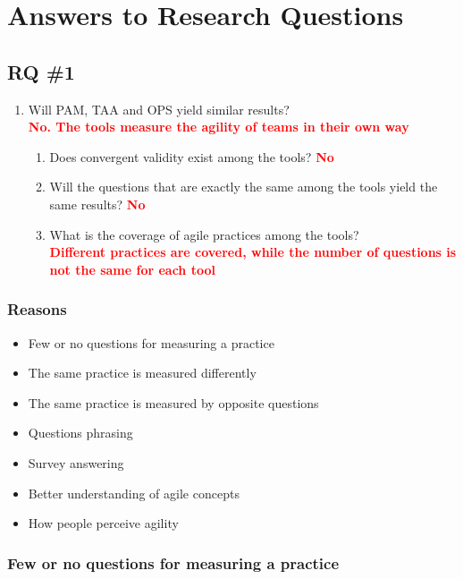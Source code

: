 \section{Answers to Research Questions}

\subsection{RQ \#1}

\begin{enumerate}
	\item Will PAM, TAA and OPS yield similar results? \\ \textcolor{red}{\textbf{No. The tools measure the agility of teams in their own way}}
    \setcounter{enumTemp}{\theenumi}
	\begin{enumerate}[label*=\arabic*.]
		\item Does convergent validity exist among the tools? \textcolor{red}{\textbf{No}}
		\item Will the questions that are exactly the same among the tools yield the same results? \textcolor{red}{\textbf{No}}
		\item What is the coverage of agile practices among the tools? \\ \textcolor{red}{\textbf{Different practices are covered, while the number of questions is not the same for each tool}}
	\end{enumerate}
\end{enumerate}

\subsubsection{Reasons}

\begin{itemize}
	\item Few or no questions for measuring a practice
	\item The same practice is measured differently
	\item The same practice is measured by opposite questions
	\item Questions phrasing
	\item Survey answering
	\item Better understanding of agile concepts
	\item How people perceive agility
\end{itemize}

\clearpage

\subsubsection{Few or no questions for measuring a practice}

